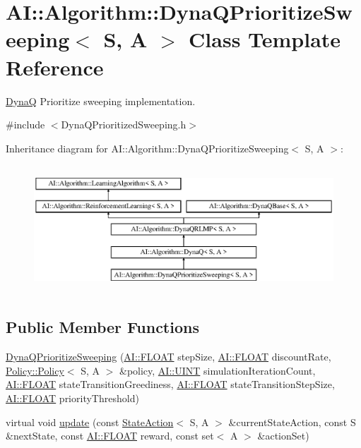 \hypertarget{classAI_1_1Algorithm_1_1DynaQPrioritizeSweeping}{\section{A\+I\+:\+:Algorithm\+:\+:Dyna\+Q\+Prioritize\+Sweeping$<$ S, A $>$ Class Template Reference}
\label{classAI_1_1Algorithm_1_1DynaQPrioritizeSweeping}
}


\hyperlink{classAI_1_1Algorithm_1_1DynaQ}{Dyna\+Q} Prioritize sweeping implementation.  




{\ttfamily \#include $<$Dyna\+Q\+Prioritized\+Sweeping.\+h$>$}

Inheritance diagram for A\+I\+:\+:Algorithm\+:\+:Dyna\+Q\+Prioritize\+Sweeping$<$ S, A $>$\+:\begin{figure}[H]
\begin{center}
\leavevmode
\includegraphics[height=4.794520cm]{classAI_1_1Algorithm_1_1DynaQPrioritizeSweeping}
\end{center}
\end{figure}
\subsection*{Public Member Functions}
\begin{DoxyCompactItemize}
\item 
\hyperlink{classAI_1_1Algorithm_1_1DynaQPrioritizeSweeping_ac1b32e8772e967a3bb74ac34708e4dfe}{Dyna\+Q\+Prioritize\+Sweeping} (\hyperlink{namespaceAI_a41b74884a20833db653dded3918e05c3}{A\+I\+::\+F\+L\+O\+A\+T} step\+Size, \hyperlink{namespaceAI_a41b74884a20833db653dded3918e05c3}{A\+I\+::\+F\+L\+O\+A\+T} discount\+Rate, \hyperlink{classAI_1_1Algorithm_1_1Policy_1_1Policy}{Policy\+::\+Policy}$<$ S, A $>$ \&policy, \hyperlink{namespaceAI_ab6e14dc1e659854858a87e511f1439ec}{A\+I\+::\+U\+I\+N\+T} simulation\+Iteration\+Count, \hyperlink{namespaceAI_a41b74884a20833db653dded3918e05c3}{A\+I\+::\+F\+L\+O\+A\+T} state\+Transition\+Greediness, \hyperlink{namespaceAI_a41b74884a20833db653dded3918e05c3}{A\+I\+::\+F\+L\+O\+A\+T} state\+Transition\+Step\+Size, \hyperlink{namespaceAI_a41b74884a20833db653dded3918e05c3}{A\+I\+::\+F\+L\+O\+A\+T} priority\+Threshold)
\item 
virtual void \hyperlink{classAI_1_1Algorithm_1_1DynaQPrioritizeSweeping_ad08b55f3cf927189dd31abf9fc1c2959}{update} (const \hyperlink{classAI_1_1StateAction}{State\+Action}$<$ S, A $>$ \&current\+State\+Action, const S \&next\+State, const \hyperlink{namespaceAI_a41b74884a20833db653dded3918e05c3}{A\+I\+::\+F\+L\+O\+A\+T} reward, const set$<$ A $>$ \&action\+Set)
\end{DoxyCompactItemize}
